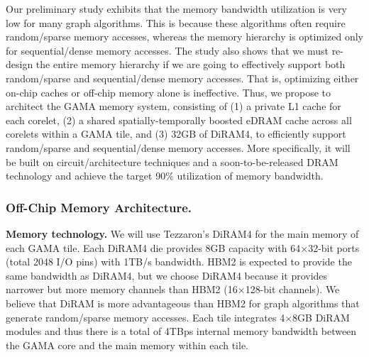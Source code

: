 



\noindent
Our preliminary study exhibits that the memory bandwidth utilization is very low for many graph algorithms.
This is because these algorithms often require random/sparse memory accesses, whereas the memory hierarchy is optimized only for sequential/dense memory accesses.
The study also shows that we must re-design the entire memory hierarchy if we are going to effectively support both random/sparse and sequential/dense memory accesses.
That is, optimizing either on-chip caches or off-chip memory alone is ineffective.
Thus, we propose to architect the GAMA memory system, consisting of (1) a private L1 cache for each corelet, (2) a shared spatially-temporally boosted eDRAM cache across all corelets within a GAMA tile, and (3) 32GB of DiRAM4, to efficiently support random/sparse and sequential/dense memory accesses.
More specifically, it will be built on circuit/architecture techniques and a soon-to-be-released DRAM technology and achieve the target 90\% utilization of memory bandwidth. 

\noindent
\subsubsection{Off-Chip Memory Architecture.} 
\label{sec:memory:off-chip}
\noindent
\textbf{Memory technology.} 
We will use  Tezzaron's DiRAM4 for the main memory of each GAMA tile.  
Each DiRAM4 die provides 8GB capacity with 64$\times$32-bit ports (total 2048 I/O pins) with 1TB/s bandwidth. 
HBM2 is expected to provide the same bandwidth as DiRAM4, but we choose DiRAM4 because it provides narrower but more memory channels than HBM2 (16$\times$128-bit channels). 
We believe that DiRAM is more advantageous than HBM2 for graph algorithms that generate random/sparse memory accesses. 
Each tile integrates 4$\times$8GB DiRAM modules and thus there is a total of 4TBps internal memory bandwidth between the GAMA core and the main memory within each tile. 


